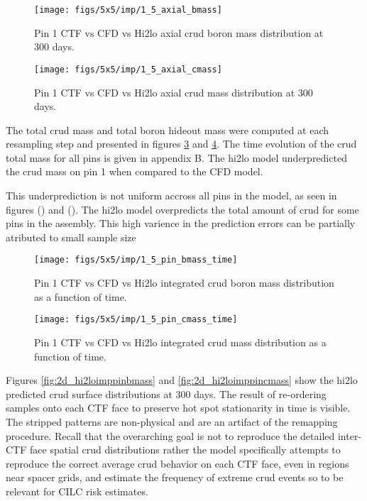 \begin{figure}[H]
    \centering
    \texttt{[image: figs/5x5/imp/1\_5\_axial\_bmass]}
    \caption{Pin 1 CTF vs CFD vs Hi2lo axial crud boron mass distribution at 300 days.}
    \label{fig:15axialbmass}
\end{figure}
\begin{figure}[H]
    \centering
    \texttt{[image: figs/5x5/imp/1\_5\_axial\_cmass]}
    \caption{Pin 1 CTF vs CFD vs Hi2lo axial crud mass distribution at 300 days.}
    \label{fig:15axialcmass}
\end{figure}

The total crud mass and total boron hideout mass were computed at each resampling step and presented in figures \ref{fig:15pinbmasstime} and \ref{fig:15pincmasstime}.  The time evolution of the crud total mass for all pins is given in appendix B.  The hi2lo model underpredicted the crud mass on pin 1 when compared to the CFD model.

This underprediction is not uniform accross all pins in the model, as seen in figures () and ().  The hi2lo model overpredicts the total amount of crud for some pins in the assembly.  This high varience in the prediction errors can be partially atributed to small sample size

\begin{figure}[H]
    \centering
    \texttt{[image: figs/5x5/imp/1\_5\_pin\_bmass\_time]}
    \caption{Pin 1 CTF vs CFD vs Hi2lo integrated crud boron mass distribution as a function of time.}
    \label{fig:15pinbmasstime}
\end{figure}
\begin{figure}[H]
    \centering
    \texttt{[image: figs/5x5/imp/1\_5\_pin\_cmass\_time]}
    \caption{Pin 1 CTF vs CFD vs Hi2lo integrated crud mass distribution as a function of time.}
    \label{fig:15pincmasstime}
\end{figure}

Figures \ref{fig:2d_hi2loimppinbmass} and \ref{fig:2d_hi2loimppincmass} show the hi2lo predicted crud surface distributions at 300 days.  The result of re-ordering samples onto each CTF face to preserve hot spot stationarity in time is visible.  The stripped patterns are non-physical and are an artifact of the remapping procedure.  Recall that the overarching goal is not to reproduce the detailed inter-CTF face spatial crud distributions rather the model specifically attempts to reproduce the correct average crud behavior on each CTF face, even in regions near spacer grids, and estimate the frequency of extreme crud events so to be relevant for CILC risk estimates.


